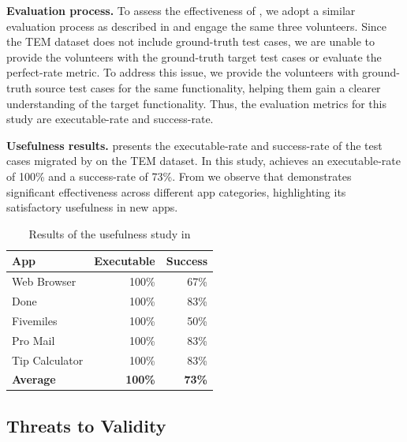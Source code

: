\textbf{Evaluation process.} To assess the effectiveness of \toolNameSmall{}, we adopt a similar evaluation process as described in  and engage the same three volunteers. Since the TEM dataset does not include ground-truth test cases, we are unable to provide the volunteers with the ground-truth target test cases or evaluate the perfect-rate metric. 
To address this issue, we provide the volunteers with ground-truth source test cases for the same functionality, helping them gain a clearer understanding of the target functionality.
Thus, the evaluation metrics for this study are executable-rate and success-rate.

\textbf{Usefulness results.}  presents the executable-rate and success-rate of the test cases migrated by \toolNameSmall{} on the TEM dataset. In this study, \toolNameSmall{} achieves an executable-rate of 100\% and a success-rate of 73\%. From  we observe that \toolNameSmall{} demonstrates significant effectiveness across different app categories, highlighting its satisfactory usefulness in new apps.


\begin{table}[t]
  \centering
  \caption{Results of the usefulness study in \toolNameSmall{}}
    \begin{tabular}{l|r|r}
    \toprule
    \textbf{App} & \multicolumn{1}{l|}{\textbf{Executable}} & \multicolumn{1}{l}{\textbf{Success}} \\
    \midrule
    Web Browser & 100\% & 67\% \\
    Done  & 100\% & 83\% \\
    Fivemiles & 100\% & 50\% \\
    Pro Mail & 100\% & 83\% \\
    Tip Calculator & 100\% & 83\% \\
    \midrule
    \textbf{Average} & \textbf{100\%} & \textbf{73\%} \\
    \bottomrule
    \end{tabular}%
  \label{tab:new-app}%
\end{table}%



\subsection{Threats to Validity}

